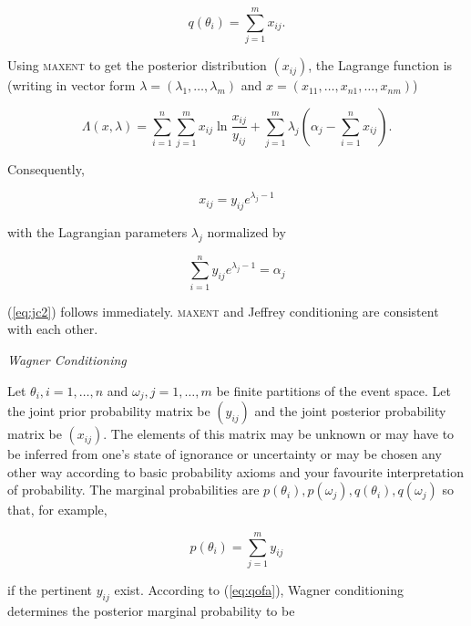 \documentclass[11pt]{article}
\begin{document}
\begin{equation}
  \label{eq:jc3}
  q(\theta_{i})=\sum_{j=1}^{m}x_{ij}.
\end{equation}

Using \textsc{maxent} to get the posterior distribution $(x_{ij})$,
the Lagrange function is (writing in vector form
$\lambda=(\lambda_{1},\ldots,\lambda_{m})$ and
$x=(x_{11},\ldots,x_{n1},\ldots,x_{nm})$)

\begin{equation}
  \label{eq:jclag}
  \Lambda(x,\lambda)=\sum_{i=1}^{n}\sum_{j=1}^{m}x_{ij}\ln\frac{x_{ij}}{y_{ij}}+\sum_{j=1}^{m}\lambda_{j}\left(\alpha_{j}-\sum_{i=1}^{n}x_{ij}\right).
\end{equation}

Consequently,

\begin{equation}
  \label{eq:jc4}
  x_{ij}=y_{ij}e^{\lambda_{j}-1}
\end{equation}

with the Lagrangian parameters $\lambda_{j}$ normalized by

\begin{equation}
  \label{eq:jc5}
  \sum_{i=1}^{n}y_{ij}e^{\lambda_{j}-1}=\alpha_{j}
\end{equation}

(\ref{eq:jc2}) follows immediately. \textsc{maxent} and Jeffrey
conditioning are consistent with each other.

\medskip

{\noindent}\emph{Wagner Conditioning}

\medskip

{\noindent}Let $\theta_{i},i=1,\ldots,n$ and
$\omega_{j},j=1,\ldots,m$ be finite partitions of the event space. Let
the joint prior probability matrix be $(y_{ij})$ and the joint
posterior probability matrix be $(x_{ij})$. The elements of this
matrix may be unknown or may have to be inferred from one's state of
ignorance or uncertainty or may be chosen any other way according to
basic probability axioms and your favourite interpretation of
probability. The marginal probabilities are
$p(\theta_{i}),p(\omega_{j}),q(\theta_{i}),q(\omega_{j})$ so that, for
example,

\begin{equation}
  \label{eq:wc1}
  p(\theta_{i})=\sum_{j=1}^{m}y_{ij}
\end{equation}

if the pertinent $y_{ij}$ exist. According to (\ref{eq:qofa}), Wagner
conditioning determines the posterior marginal probability to be
\end{document}
